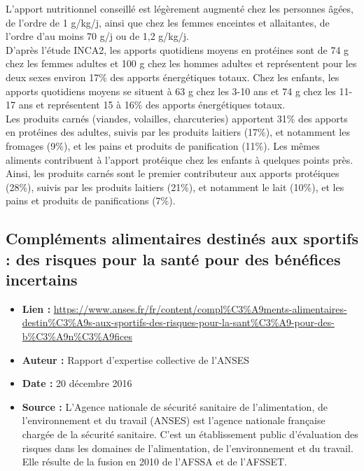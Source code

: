 \documentclass[8pt]{article}
\begin{document}
L’apport nutritionnel conseillé est légèrement augmenté chez les personnes âgées, de l’ordre de 1 g/kg/j, ainsi que chez les femmes enceintes et allaitantes, de l’ordre d’au moins 70 g/j ou de 1,2 g/kg/j.\\

D’après l’étude INCA2, les apports quotidiens moyens en protéines sont de 74 g chez les femmes adultes et 100 g chez les hommes adultes et représentent pour les deux sexes environ 17\% des apports énergétiques totaux. Chez les enfants, les apports quotidiens moyens se situent à 63 g chez les 3-10 ans et 74 g chez les 11-17 ans et représentent 15 à 16\% des apports énergétiques totaux.\\

Les produits carnés (viandes, volailles, charcuteries) apportent 31\% des apports en protéines des adultes, suivis par les produits laitiers (17\%), et notamment les fromages (9\%), et les pains et produits de panification (11\%). Les mêmes aliments contribuent à l’apport protéique chez les enfants à quelques points près. Ainsi, les produits carnés sont le premier contributeur aux apports protéiques (28\%), suivis par les produits laitiers (21\%), et notamment le lait (10\%), et les pains et produits de panifications (7\%).

\newpage
\subsection{Compléments alimentaires destinés aux sportifs : des risques pour la santé pour des bénéfices incertains}

\begin{itemize}
	\item \textbf{Lien : }  \url{https://www.anses.fr/fr/content/compl\%C3\%A9ments-alimentaires-destin\%C3\%A9s-aux-sportifs-des-risques-pour-la-sant\%C3\%A9-pour-des-b\%C3\%A9n\%C3\%A9fices} 
	\item \textbf{Auteur : } Rapport d’expertise collective de l'ANSES
	
	\item \textbf{Date : } 20 décembre 2016
	\item \textbf{Source : } L’Agence nationale de sécurité sanitaire de l'alimentation, de l'environnement et du travail (ANSES) est l'agence nationale française chargée de la sécurité sanitaire. C'est un établissement public d'évaluation des risques dans les domaines de l'alimentation, de l'environnement et du travail. Elle résulte de la fusion en 2010 de l'AFSSA et de l'AFSSET. 
\end{itemize}
\end{document}
